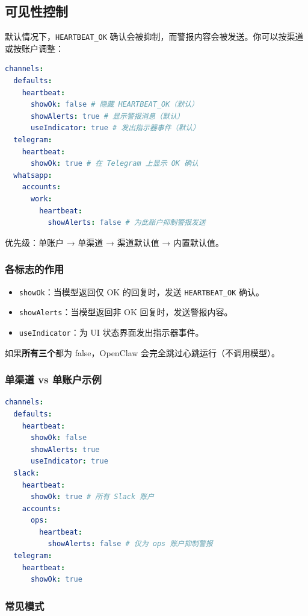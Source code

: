 \subsection{可见性控制}


默认情况下，\texttt{HEARTBEAT\_OK} 确认会被抑制，而警报内容会被发送。你可以按渠道或按账户调整：

\begin{lstlisting}[language=yaml]
channels:
  defaults:
    heartbeat:
      showOk: false # 隐藏 HEARTBEAT_OK（默认）
      showAlerts: true # 显示警报消息（默认）
      useIndicator: true # 发出指示器事件（默认）
  telegram:
    heartbeat:
      showOk: true # 在 Telegram 上显示 OK 确认
  whatsapp:
    accounts:
      work:
        heartbeat:
          showAlerts: false # 为此账户抑制警报发送
\end{lstlisting}


优先级：单账户 → 单渠道 → 渠道默认值 → 内置默认值。

\subsubsection{各标志的作用}


\begin{itemize}
  \item \texttt{showOk}：当模型返回仅 OK 的回复时，发送 \texttt{HEARTBEAT\_OK} 确认。
  \item \texttt{showAlerts}：当模型返回非 OK 回复时，发送警报内容。
  \item \texttt{useIndicator}：为 UI 状态界面发出指示器事件。
\end{itemize}


如果\textbf{所有三个}都为 false，OpenClaw 会完全跳过心跳运行（不调用模型）。

\subsubsection{单渠道 vs 单账户示例}


\begin{lstlisting}[language=yaml]
channels:
  defaults:
    heartbeat:
      showOk: false
      showAlerts: true
      useIndicator: true
  slack:
    heartbeat:
      showOk: true # 所有 Slack 账户
    accounts:
      ops:
        heartbeat:
          showAlerts: false # 仅为 ops 账户抑制警报
  telegram:
    heartbeat:
      showOk: true
\end{lstlisting}


\subsubsection{常见模式}



